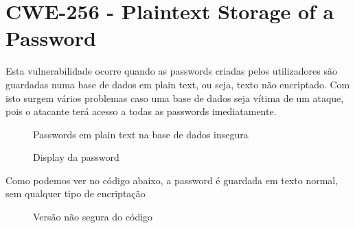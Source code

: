 \documentclass[12pt]{report}
\begin{document}
\section{CWE-256 - Plaintext Storage of a Password} \label{256}
Esta vulnerabilidade ocorre quando as passwords criadas pelos utilizadores são guardadas numa base de dados em plain text, ou seja, texto não encriptado. Com isto surgem vários problemas caso uma base de dados seja vítima de um ataque, pois o atacante terá acesso a todas as passwords imediatamente.

\begin{figure}[H]{
\centering
{
\caption{Passwords em plain text na base de dados insegura}
}
}\end{figure}

\begin{figure}[H]{
\centering
{
\caption{Display da password}
}
}\end{figure}

Como podemos ver no código abaixo, a password é guardada em texto normal, sem qualquer tipo de encriptação

\begin{figure}[H]{
\centering
{
\caption{Versão não segura do código}
}
}\end{figure}
\end{document}
